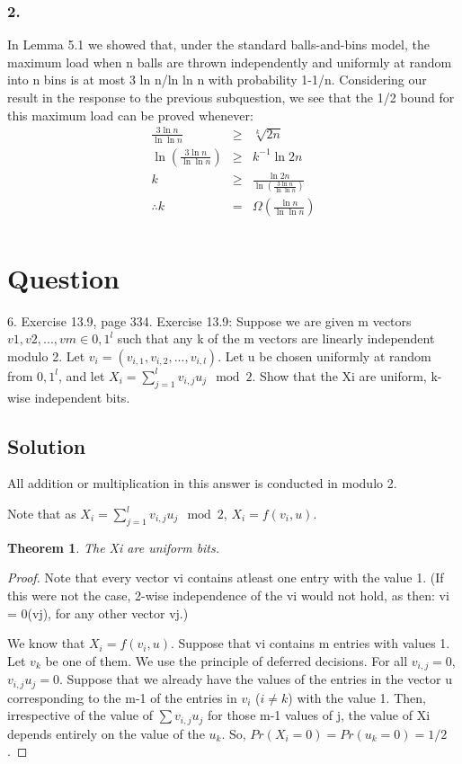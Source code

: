 \documentclass[10pt]{amsart}
\newtheorem{thm}{Theorem}[subsection]
\theoremstyle{remark}
\begin{document}
\subsubsection{2.} 
In Lemma 5.1 we showed that, under the standard balls-and-bins model, the maximum load when n balls are thrown independently and uniformly at random into n bins is at most 3 ln n/ln ln n with probability 1-1/n. Considering our result in the response to the previous subquestion, we see that the 1/2 bound for this maximum load can be proved whenever:
\begin{eqnarray}
\frac{3\ln n}{\ln \ln n} &\geq& \sqrt[k]{2n}\\
\ln (\frac{3\ln n}{\ln \ln n}) &\geq& k^{-1}\ln 2n\\
k &\geq& \frac{\ln 2n}{\ln (\frac{3\ln n}{\ln \ln n})}\\
\therefore k &=& \Omega(\frac{\ln n}{\ln \ln n})\\ 
\end{eqnarray} 

\section{Question}
6. Exercise 13.9, page 334. Exercise 13.9: Suppose we are given m vectors $v1, v2, ..., vm \in {0, 1}^{l}$ such that any k of the m vectors are linearly independent modulo 2. Let $v_{i}=(v_{i,1}, v_{i,2},..., v_{i,l})$. Let u be chosen uniformly at random from ${0, 1}^{l}$, and let $X_{i}=\sum_{j=1}^{l}v_{i,j}u_{j} \mod 2$. Show that the Xi are uniform, k-wise independent bits.

\subsection{Solution}
All addition or multiplication in this answer is conducted in modulo 2.

Note that as $X_{i}=\sum_{j=1}^{l}v_{i,j}u_{j} \mod 2$, $X_{i} = f(v_{i},u)$.

\begin{thm}
The Xi are uniform bits.
\end{thm}
\begin{proof}
Note that every vector vi contains atleast one entry with the value 1. (If this were not the case, 2-wise independence of the vi would not hold, as then: vi = 0(vj), for any other vector vj.)

We know that $X_{i} = f(v_{i},u)$. Suppose that vi contains m entries with values 1. Let $v_{k}$ be one of them. We use the principle of deferred decisions. For all $v_{i,j} = 0$, $v_{i,j}u_{j}=0$. Suppose that we already have the values of the entries in the vector u corresponding to the m-1 of the entries in $v_{i}$ ($i\neq k$) with the value 1. Then, irrespective of the value of $\sum v_{i,j}u_{j}$ for those m-1 values of j, the value of Xi depends entirely on the value of the $u_{k}$. So, $Pr(X_{i}=0) = Pr(u_{k}=0) = 1/2$.
\end{proof}
\end{document}
